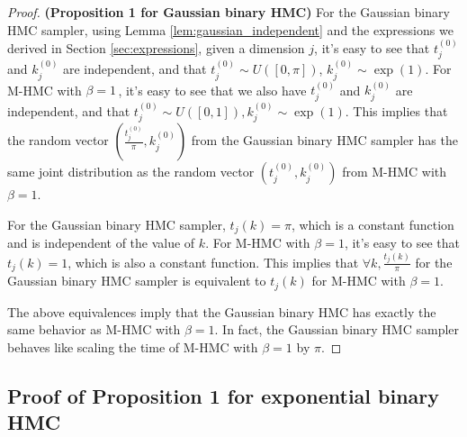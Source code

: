 \documentclass{article}
\begin{document}
\begin{proof}\textbf{(Proposition 1 for Gaussian binary HMC)}
For the Gaussian binary HMC sampler, using Lemma \ref{lem:gaussian_independent} and the expressions we derived in Section \ref{sec:expressions}, given a dimension $j$, it's easy to see that $t_j^{(0)}$ and $k_j^{(0)}$ are independent, and that $t_j^{(0)} \sim U ([0, \pi])$, $k_j^{(0)} \sim \exp (1)$. For M-HMC with $\beta = 1 \,$, it's easy to see that we also have $t_j^{(0)}$ and $k_j^{(0)}$ are independent, and that $t_j^{(0)} \sim U ([0, 1]), k_j^{(0)} \sim \exp (1)$. This implies that the random vector $\left( \frac{t_j^{(0)}}{\pi}, k_j^{(0)} \right)$ from the Gaussian binary HMC sampler has the same joint distribution as the random vector $(t_j^{(0)}, k_j^{(0)})$ from M-HMC with $\beta = 1$.  

For the Gaussian binary HMC sampler, $t_j (k) = \pi$, which is a constant function and is independent of the value of $k$. For M-HMC with $\beta = 1$, it's easy to see that $t_j (k) = 1$, which is also a constant function. This implies that $\forall k, \frac{t_j (k)}{\pi}$ for the Gaussian binary HMC sampler is equivalent to $t_j (k)$ for M-HMC with $\beta = 1$.

The above equivalences imply that the Gaussian binary HMC has exactly the same behavior as M-HMC with $\beta = 1$. In fact, the Gaussian binary HMC sampler behaves like scaling the time of M-HMC with $\beta = 1$ by $\pi$.
\end{proof}

\subsection{Proof of Proposition 1 for exponential binary HMC}
\end{document}
